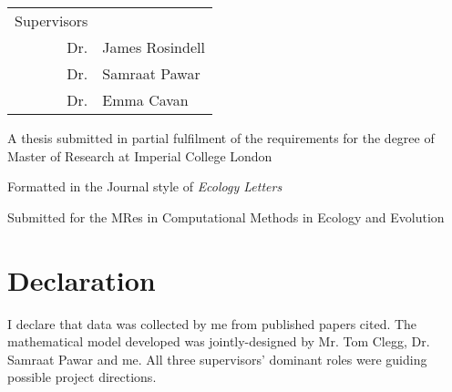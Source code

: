 \documentclass[../thesis.tex]{subfiles} %
\begin{document}
\maketitle
\begin{center}
\begin{tabular}{rl}
    Supervisors & \\
    Dr. & James Rosindell \\
    Dr. & Samraat Pawar \\
    Dr. & Emma Cavan
\end{tabular}
\end{center}
\vspace{15cm}
\begin{center}
    A thesis submitted in partial fulfilment of the requirements for the degree of Master of Research at Imperial College London
    
    Formatted in the Journal style of \textit{Ecology Letters}
    
    Submitted for the MRes in Computational Methods in Ecology and Evolution
\end{center}
\clearpage

\section{Declaration}
I declare that data was collected by me from published papers cited.  The mathematical model developed was jointly-designed by Mr. Tom Clegg, Dr. Samraat Pawar and me.  All three supervisors' dominant roles were guiding possible project directions.
\tableofcontents
\listoffigures
\listoftables
\end{document}

